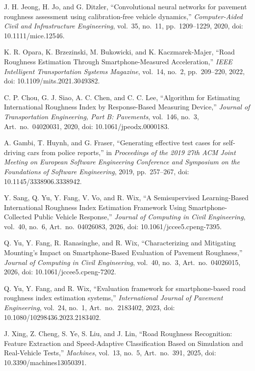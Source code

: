 J. H. Jeong, H. Jo, and G. Ditzler, ``Convolutional neural networks for pavement roughness assessment using calibration-free vehicle dynamics,'' \emph{Computer-Aided Civil and Infrastructure Engineering}, vol.~35, no.~11, pp.~1209--1229, 2020, doi: 10.1111/mice.12546.

K. R. Opara, K. Brzezinski, M. Bukowicki, and K. Kaczmarek-Majer, ``Road Roughness Estimation Through Smartphone-Measured Acceleration,'' \emph{IEEE Intelligent Transportation Systems Magazine}, vol.~14, no.~2, pp.~209--220, 2022, doi: 10.1109/mits.2021.3049382.

C. P. Chou, G. J. Siao, A. C. Chen, and C. C. Lee, ``Algorithm for Estimating International Roughness Index by Response-Based Measuring Device,'' \emph{Journal of Transportation Engineering, Part B: Pavements}, vol.~146, no.~3, Art.~no.~04020031, 2020, doi: 10.1061/jpeodx.0000183.

A. Gambi, T. Huynh, and G. Fraser, ``Generating effective test cases for self-driving cars from police reports,'' in \emph{Proceedings of the 2019 27th ACM Joint Meeting on European Software Engineering Conference and Symposium on the Foundations of Software Engineering}, 2019, pp.~257--267, doi: 10.1145/3338906.3338942.

Y. Sang, Q. Yu, Y. Fang, V. Vo, and R. Wix, ``A Semisupervised Learning-Based International Roughness Index Estimation Framework Using Smartphone-Collected Public Vehicle Response,'' \emph{Journal of Computing in Civil Engineering}, vol.~40, no.~6, Art.~no.~04026083, 2026, doi: 10.1061/jccee5.cpeng-7395.

Q. Yu, Y. Fang, R. Ranasinghe, and R. Wix, ``Characterizing and Mitigating Mounting’s Impact on Smartphone-Based Evaluation of Pavement Roughness,'' \emph{Journal of Computing in Civil Engineering}, vol.~40, no.~3, Art.~no.~04026015, 2026, doi: 10.1061/jccee5.cpeng-7202.

Q. Yu, Y. Fang, and R. Wix, ``Evaluation framework for smartphone-based road roughness index estimation systems,'' \emph{International Journal of Pavement Engineering}, vol.~24, no.~1, Art.~no.~2183402, 2023, doi: 10.1080/10298436.2023.2183402.

J. Xing, Z. Cheng, S. Ye, S. Liu, and J. Lin, ``Road Roughness Recognition: Feature Extraction and Speed-Adaptive Classification Based on Simulation and Real-Vehicle Tests,'' \emph{Machines}, vol.~13, no.~5, Art.~no.~391, 2025, doi: 10.3390/machines13050391.


